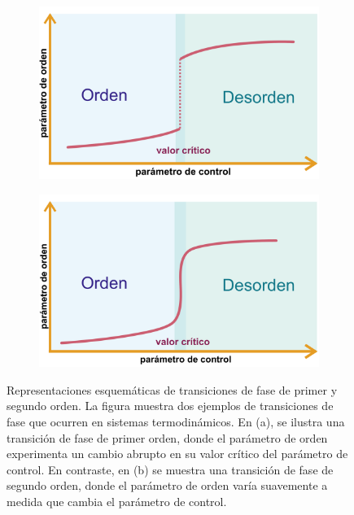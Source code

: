 \begin{figure}[ht]
	\centering
	\begin{subfigure}[b]{0.45\textwidth}
		\centering
		\includegraphics[width=\textwidth]{transiciones_fases_tipo_I.pdf}
		\caption{}
		\label{fig:transicionI}
	\end{subfigure}
	\begin{subfigure}[b]{0.45\textwidth}
		\centering
		\includegraphics[width=\textwidth]{transiciones_fases_tipo_II.pdf}
		\caption{}
		\label{fig:transicionII}
	\end{subfigure}
	\caption[Representaciones esquemáticas de transiciones de fase de primer y segundo orden.]{Representaciones esquemáticas de transiciones de fase de primer y segundo orden. La figura muestra dos ejemplos de transiciones de fase que ocurren en sistemas termodinámicos. En (a), se ilustra una transición de fase de primer orden, donde el parámetro de orden experimenta un cambio abrupto en su valor crítico del parámetro de control. En contraste, en (b) se muestra una transición de fase de segundo orden, donde el parámetro de orden varía suavemente a medida que cambia el parámetro de control.}
	\label{fig:trancisiones}
\end{figure}

